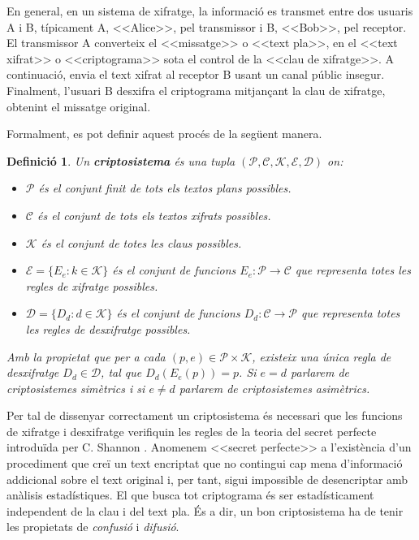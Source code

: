 \documentclass[11pt,a4paper,openright,oneside]{article}
\numberwithin{equation}{section}
\newtheorem{defi}[teo]{Definici\'o}
\theoremstyle{definition}
\begin{document}
En general, en un sistema de xifratge, la informació es transmet entre dos usuaris A i B, típicament A, <<Alice>>, pel transmissor i B, <<Bob>>, pel receptor. El transmissor A converteix el <<missatge>> o <<text pla>>, en el <<text xifrat>> o <<criptograma>> sota el control de la <<clau de xifratge>>. A continuació, envia el text xifrat al receptor B usant un canal públic insegur. Finalment, l'usuari B desxifra el criptograma mitjançant la clau de xifratge, obtenint el missatge original. 

Formalment, es pot definir aquest procés de la següent manera.

\begin{defi}
    Un \textbf{criptosistema} és una tupla $(\mathcal{P},\mathcal{C},\mathcal{K},\mathcal{E},\mathcal{D})$ on:\begin{itemize}
        \item $\mathcal{P}$ és el conjunt finit de tots els textos plans possibles.
        
        \item $\mathcal{C}$ és el conjunt de tots els textos xifrats possibles.
        
        \item $\mathcal{K}$ és el conjunt de totes les claus possibles.
        
        \item $\mathcal{E}=\{E_e:k\in\mathcal{K}\}$ és el conjunt de funcions $E_e:\mathcal{P}\rightarrow{\mathcal{C}}$ que representa totes les regles de xifratge possibles.
        
        \item $\mathcal{D}=\{D_d:d\in\mathcal{K}\}$ és el conjunt de funcions $D_d:\mathcal{C}\rightarrow{\mathcal{P}}$ que representa totes les regles de desxifratge possibles.
    \end{itemize}
    
    Amb la propietat que per a cada $(p,e)\in\mathcal{P}\times\mathcal{K}$, existeix una única regla de desxifratge $D_d\in\mathcal{D}$, tal que $D_d\left(E_e\left(p\right)\right)=p$. Si $e=d$ parlarem de criptosistemes simètrics i si $e\neq d$ parlarem de criptosistemes asimètrics.
\end{defi}

Per tal de dissenyar correctament un criptosistema és necessari que les funcions de xifratge i desxifratge verifiquin les regles de la teoria del secret perfecte introduïda per C. Shannon \cite{Shannon_1}. Anomenem <<secret perfecte>> a l'existència d'un procediment que creï un text encriptat que no contingui cap mena d'informació addicional sobre el text original i, per tant, sigui impossible de desencriptar amb anàlisis estadístiques. El que busca tot criptograma és ser estadísticament independent de la clau i del text pla. És a dir, un bon criptosistema ha de tenir les propietats de \textit{confusió} i \textit{difusió}.
\end{document}
